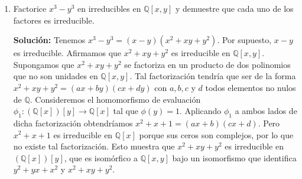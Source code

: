 \begin{enumerate}
    \item Factorice \( x^3 - y^3 \) en irreducibles en \( \mathbb{Q}[x, y] \) y demuestre que cada uno de los factores es irreducible.
    
    \textbf{Solución:} Tenemos \( x^3 - y^3 = (x - y)(x^2 + xy + y^2) \). Por supuesto, \( x - y \) es irreducible. Afirmamos que \( x^2 + xy + y^2 \) es irreducible en \( \mathbb{Q}[x, y] \). Supongamos que \( x^2 + xy + y^2 \) se factoriza en un producto de dos polinomios que no son unidades en \( \mathbb{Q}[x, y] \). Tal factorización tendría que ser de la forma \( x^2 + xy + y^2 = (ax + by)(cx + dy) \) con \( a, b, c \) y \( d \) todos elementos no nulos de \( \mathbb{Q} \). Consideremos el homomorfismo de evaluación \( \phi_1 : (\mathbb{Q}[x])[y] \to \mathbb{Q}[x] \) tal que \( \phi(y) = 1 \). Aplicando \( \phi_1 \) a ambos lados de dicha factorización obtendríamos \( x^2 + x + 1 = (ax + b)(cx + d) \). Pero \( x^2 + x + 1 \) es irreducible en \( \mathbb{Q}[x] \) porque sus ceros son complejos, por lo que no existe tal factorización. Esto muestra que \( x^2 + xy + y^2 \) es irreducible en \( (\mathbb{Q}[x])[y] \), que es isomórfico a \( \mathbb{Q}[x, y] \) bajo un isomorfismo que identifica \( y^2 + yx + x^2 \) y \( x^2 + xy + y^2 \).

\end{enumerate}

